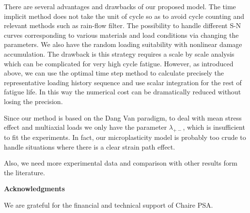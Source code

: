 \documentclass[3p,times,procedia,number]{elsarticle}
\begin{document}
There are several advantages and drawbacks of our proposed model. The time implicit method does not take the unit of cycle so as to avoid cycle counting and relevant methods such as rain-flow filter. The possibility to handle different S-N curves corresponding to various materials and load conditions via changing the parameters. We also have the random loading suitability with nonlinear damage accumulation. The drawback is this strategy requires a scale by scale analysis which can be complicated for very high cycle fatigue. However, as introduced above, we can use the optimal time step method to calculate precisely the representative loading history sequence and use scalar integration for the rest of fatigue life. In this way the numerical cost can be dramatically reduced without losing the precision.

Since our method is based on the Dang Van paradigm, to deal with mean stress effect and multiaxial loads we only have the parameter $\lambda_{+-}$, which is insufficient to fit the experiments. In fact, our microplasticity model is probably too crude to handle situations where there is  a clear strain path effect.

Also, we need more experimental data and comparison with other results form the literature.



\vspace{6pt}
\noindent
\textbf{Acknowledgments}

\vspace{6pt}
We are grateful for the financial and technical support of Chaire PSA.






%	
%	
\end{document}
